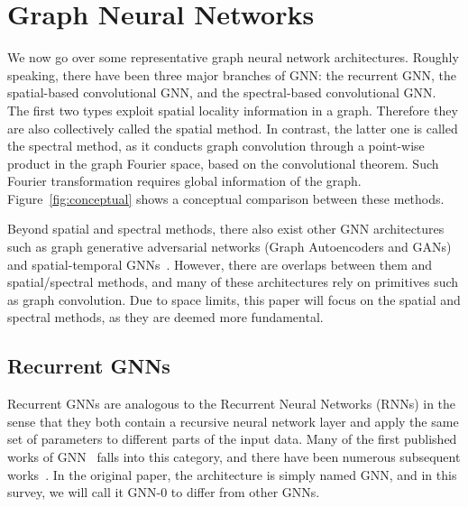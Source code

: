 \vspace{-2mm}
\section{Graph Neural Networks}\label{sec:gnn}
We now go over some representative graph neural network architectures. Roughly speaking, there have been three major branches of GNN: the recurrent GNN, the spatial-based convolutional GNN, and the spectral-based convolutional GNN. The first two types exploit spatial locality information in a graph. Therefore they are also collectively called the spatial method. In contrast, the latter one is called the spectral method, as it conducts graph convolution through a point-wise product in the graph Fourier space, based on the convolutional theorem. Such Fourier transformation requires global information of the graph. Figure~\ref{fig:conceptual} shows a conceptual comparison between these methods.

Beyond spatial and spectral methods, there also exist other GNN architectures such as graph generative adversarial networks (Graph Autoencoders and GANs)~\cite{gae, ggan} and spatial-temporal GNNs~\cite{gaan, stgnn}. However, there are overlaps between them and spatial/spectral methods, and many of these architectures rely on primitives such as graph convolution. Due to space limits, this paper will focus on the spatial and spectral methods, as they are deemed more fundamental.


\subsection{Recurrent GNNs}
Recurrent GNNs are analogous to the Recurrent Neural Networks (RNNs) in the sense that they both contain a recursive neural network layer and apply the same set of parameters to different parts of the input data. Many of the first published works of GNN~\cite{gnn0} falls into this category, and there have been numerous subsequent works~\cite{gesn, ggnn, sse}. In the original paper, the architecture is simply named GNN, and in this survey, we will call it GNN-0 to differ from other GNNs.
